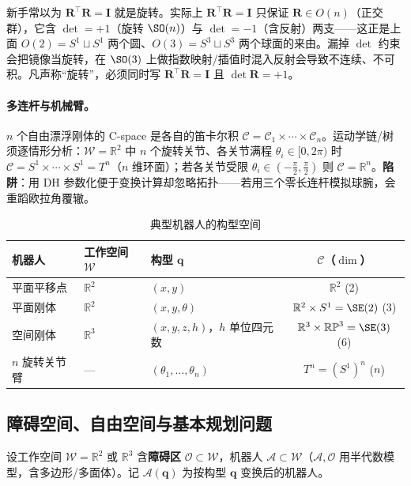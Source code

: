 \begin{pitfall}[概念误区：把“正交矩阵”等同于“旋转矩阵”，漏掉 $\det=+1$]
新手常以为 $\mathbf{R}^\top\mathbf{R}=\mathbf{I}$ 就是旋转。实际上 $\mathbf{R}^\top\mathbf{R}=\mathbf{I}$ 只保证 $\mathbf{R}\in O(n)$（正交群），它含 $\det=+1$（旋转 $\SO(n)$）与 $\det=-1$（含反射）两支——这正是上面 $O(2)=S^1\sqcup S^1$ 两个圆、$O(3)=S^3\sqcup S^3$ 两个球面的来由。漏掉 $\det$ 约束会把镜像当旋转，在 $\SO(3)$ 上做指数映射/插值时混入反射会导致不连续、不可积。凡声称“旋转”，必须同时写 $\mathbf{R}^\top\mathbf{R}=\mathbf{I}$ 且 $\det\mathbf{R}=+1$。
\end{pitfall}

\paragraph{多连杆与机械臂。}
$n$ 个自由漂浮刚体的 C-space 是各自的笛卡尔积 $\mathcal{C}=\mathcal{C}_1\times\cdots\times\mathcal{C}_n$。运动学链/树须逐情形分析：$\mathcal{W}=\mathbb{R}^2$ 中 $n$ 个旋转关节、各关节满程 $\theta_i\in[0,2\pi)$ 时 $\mathcal{C}=S^1\times\cdots\times S^1=T^n$（$n$ 维环面）；若各关节受限 $\theta_i\in(-\tfrac\pi2,\tfrac\pi2)$ 则 $\mathcal{C}=\mathbb{R}^n$。\textbf{陷阱}：用 DH 参数化便于变换计算却忽略拓扑——若用三个零长连杆模拟球腕，会重蹈欧拉角覆辙。

\begin{table}[H]\centering\small
\caption{典型机器人的构型空间}
\label{tab:plan-cspaces}
\begin{tabular}{lllc}
\toprule
机器人 & 工作空间 $\mathcal{W}$ & 构型 $\mathbf{q}$ & $\mathcal{C}$（$\dim$） \\
\midrule
平面平移点 & $\mathbb{R}^2$ & $(x,y)$ & $\mathbb{R}^2$ (2) \\
平面刚体 & $\mathbb{R}^2$ & $(x,y,\theta)$ & $\mathbb{R}^2\times S^1=\SE(2)$ (3) \\
空间刚体 & $\mathbb{R}^3$ & $(x,y,z,h)$，$h$ 单位四元数 & $\mathbb{R}^3\times\mathbb{RP}^3=\SE(3)$ (6) \\
$n$ 旋转关节臂 & --- & $(\theta_1,\dots,\theta_n)$ & $T^n=(S^1)^n$ ($n$) \\
\bottomrule
\end{tabular}
\end{table}

\subsection{障碍空间、自由空间与基本规划问题}
\label{sec:plan-cobs}

设工作空间 $\mathcal{W}=\mathbb{R}^2$ 或 $\mathbb{R}^3$ 含\textbf{障碍区} $\mathcal{O}\subset\mathcal{W}$，机器人 $\mathcal{A}\subset\mathcal{W}$（$\mathcal{A},\mathcal{O}$ 用半代数模型，含多边形/多面体）。记 $\mathcal{A}(\mathbf{q})$ 为按构型 $\mathbf{q}$ 变换后的机器人。

